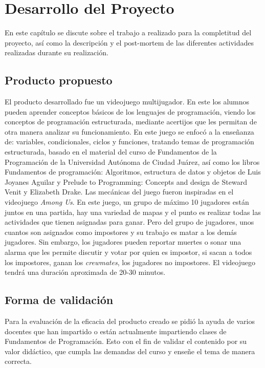 \chapter{Desarrollo del Proyecto}
En este capítulo se discute sobre el trabajo a realizado para la completitud del proyecto, así como la descripción y el post-mortem de las diferentes actividades realizadas durante su realización.

\section{Producto propuesto}
El producto desarrollado fue un videojuego multijugador. En este los alumnos pueden aprender conceptos básicos de los lenguajes de programación, viendo los conceptos de programación estructurada, mediante acertijos que les permitan de otra manera analizar su funcionamiento. En este juego se enfocó a la enseñanza de: variables, condicionales, ciclos y funciones, tratando temas de programación estructurada, basado en el material del curso de Fundamentos de la Programación de la Universidad Autónoma de Ciudad Juárez, así como los libros Fundamentos de programación: Algoritmos, estructura de datos y objetos de Luis Joyanes Aguilar y Prelude to Programming: Concepts and design de Steward Venit y Elizabeth Drake. 
Las mecánicas del juego fueron inspiradas en el videojuego \textit{Among Us}. En este juego, un grupo de máximo 10 jugadores están juntos en una partida, hay una variedad de mapas y el punto es realizar todas las actividades que tienen asignadas para ganar. Pero del grupo de jugadores, unos cuantos son asignados como impostores y su trabajo es matar a los demás jugadores. Sin embargo, los jugadores pueden reportar muertes o sonar una alarma que les permite discutir y votar por quien es impostor, si sacan a todos los impostores, ganan los \textit{crewmates}, los jugadores no impostores.
El videojuego tendrá una duración aproximada de 20-30 minutos.

\section{Forma de validación}
Para la evaluación de la eficacia del producto creado se pidió la ayuda de varios docentes que han impartido o están actualmente impartiendo clases de Fundamentos de Programación. Esto con el fin de validar el contenido por su valor didáctico, que cumpla las demandas del curso y enseñe el tema de manera correcta.


